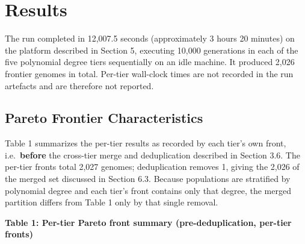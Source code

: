 \section{Results}\label{results}

The run completed in 12,007.5 seconds (approximately 3 hours 20 minutes) on the platform described in Section 5, executing 10,000 generations in each of the five polynomial degree tiers sequentially on an idle machine. It produced 2,026 frontier genomes in total. Per-tier wall-clock times are not recorded in the run artefacts and are therefore not reported.

\subsection{Pareto Frontier Characteristics}\label{pareto-frontier-characteristics}

Table 1 summarizes the per-tier results as recorded by each tier's own front, i.e.~\textbf{before} the cross-tier merge and deduplication described in Section 3.6. The per-tier fronts total 2,027 genomes; deduplication removes 1, giving the 2,026 of the merged set discussed in Section 6.3. Because populations are stratified by polynomial degree and each tier's front contains only that degree, the merged partition differs from Table 1 only by that single removal.

\textbf{Table 1: Per-tier Pareto front summary (pre-deduplication, per-tier fronts)}

